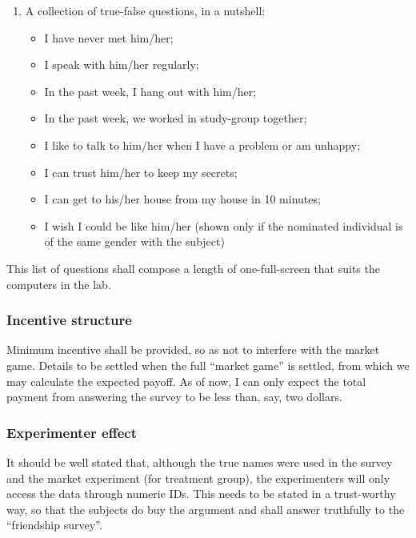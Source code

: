 \begin{enumerate}
    \item A collection of true-false questions, in a nutshell:
        \begin{itemize}
            \item I have never met him/her;
            \item I speak with him/her regularly;
            \item In the past week, I hang out with him/her;
            \item In the past week, we worked in study-group together;
            \item I like to talk to him/her when I have a problem or am unhappy;
            \item I can trust him/her to keep my secrets;
            \item I can get to his/her house from my house in 10 minutes;
            \item I wish I could be like him/her (shown only if the nominated individual is of the same gender with the subject)
        \end{itemize}
\end{enumerate}

This list of questions shall compose a length of one-full-screen that suits the
computers in the lab.

\subsubsection{Incentive structure}

Minimum incentive shall be provided, so as not to interfere with the market
game. Details to be settled when the full ``market game'' is settled, from which
we may calculate the expected payoff. As of now, I can only expect the total
payment from answering the survey to be less than, say, two dollars.

\subsubsection{Experimenter effect}

It should be well stated that, although the true names were used in the survey
and the market experiment (for treatment group), the experimenters will only
access the data through numeric IDs. This needs to be stated in a trust-worthy
way, so that the subjects do buy the argument and shall answer truthfully to the
``friendship survey''.